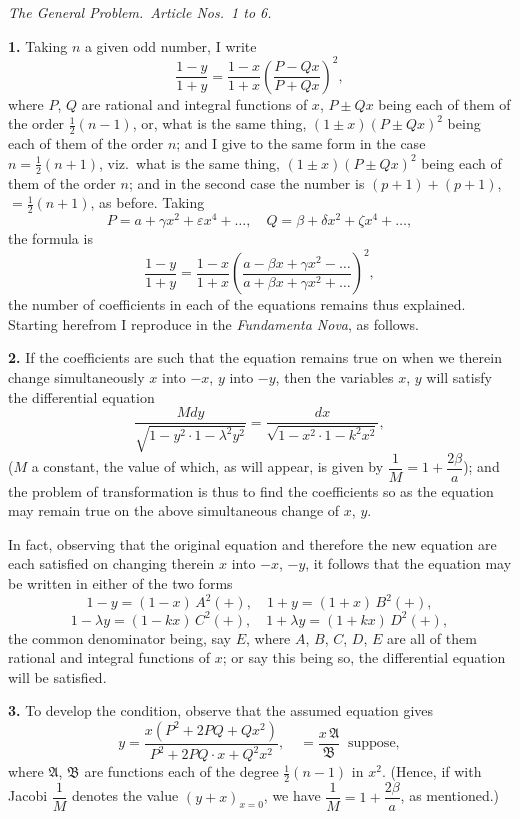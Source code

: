 \documentclass[11pt]{article}
\begin{document}
\bigskip

\noindent\textit{The General Problem.\ Article Nos.\ 1 to 6.}

\medskip

\textbf{1.} Taking $n$ a given odd number, I write
\[
\frac{1-y}{1+y} = \frac{1-x}{1+x}\!\left(\frac{P - Qx}{P + Qx}\right)^{2},
\]
where $P$, $Q$ are rational and integral functions of $x$, $P \pm Qx$ being each of them of the order $\tfrac{1}{2}(n-1)$, or, what is the same thing, $(1 \pm x)(P \pm Qx)^{2}$ being each of them of the order $n$; and I give to the same form in the case $n = \tfrac{1}{2}(n+1)$, viz.\ what is the same thing, $(1\pm x)(P\pm Qx)^{2}$ being each of them of the order $n$; and in the second case the number is $(p+1) + (p+1)$, $= \tfrac{1}{2}(n+1)$, as before. Taking
\[
P = a + \gamma x^{2} + \varepsilon x^{4} + \ldots,\quad Q = \beta + \delta x^{2} + \zeta x^{4} + \ldots,
\]
the formula is
\[
\frac{1-y}{1+y} = \frac{1-x}{1+x}\!\left(\frac{a - \beta x + \gamma x^{2} - \ldots}{a + \beta x + \gamma x^{2} + \ldots}\right)^{2},
\]
the number of coefficients in each of the equations remains thus explained. Starting herefrom I reproduce in the \textit{Fundamenta Nova}, as follows.

\textbf{2.} If the coefficients are such that the equation remains true on when we therein change simultaneously $x$ into $-x$, $y$ into $-y$, then the variables $x$, $y$ will satisfy the differential equation
\[
\frac{M dy}{\sqrt{1 - y^{2}\cdot 1 - \lambda^{2}y^{2}}} = \frac{dx}{\sqrt{1 - x^{2}\cdot 1 - k^{2}x^{2}}},
\]
($M$ a constant, the value of which, as will appear, is given by $\dfrac{1}{M} = 1 + \dfrac{2\beta}{a}$); and the problem of transformation is thus to find the coefficients so as the equation may remain true on the above simultaneous change of $x$, $y$.

In fact, observing that the original equation and therefore the new equation are each satisfied on changing therein $x$ into $-x$, $-y$, it follows that the equation may be written in either of the two forms
\[
1 - y = (1 - x)\,A^{2}(+),\quad 1 + y = (1 + x)\,B^{2}(+),
\]
\[
1 - \lambda y = (1 - kx)\,C^{2}(+),\quad 1 + \lambda y = (1 + kx)\,D^{2}(+),
\]
the common denominator being, say $E$, where $A$, $B$, $C$, $D$, $E$ are all of them rational and integral functions of $x$; or say this being so, the differential equation will be satisfied.

\textbf{3.} To develop the condition, observe that the assumed equation gives
\[
y = \frac{x(P^{2} + 2PQ + Qx^{2})}{P^{2} + 2PQ\!\cdot\! x + Q^{2}x^{2}},\quad = \frac{x\,\mathfrak{A}}{\mathfrak{B}}\ \text{ suppose},
\]
where $\mathfrak{A}$, $\mathfrak{B}$ are functions each of the degree $\tfrac{1}{2}(n-1)$ in $x^{2}$. (Hence, if with Jacobi $\dfrac{1}{M}$ denotes the value $(y + x)_{x=0}$, we have $\dfrac{1}{M} = 1 + \dfrac{2\beta}{a}$, as mentioned.)
\end{document}
